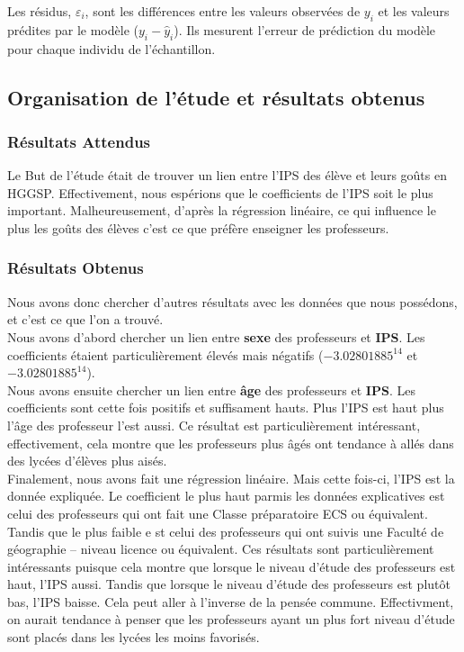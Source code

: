 \documentclass[a4paper, 11pt]{article}
\begin{document}
Les résidus, \(\varepsilon_i\), sont les différences entre les valeurs observées de \(y_i\) et les valeurs prédites par le modèle (\(y_i - \hat{y}_i\)). Ils mesurent l'erreur de prédiction du modèle pour chaque individu de l'échantillon.

\subsection{Organisation de l'étude et résultats obtenus}
\subsubsection{Résultats Attendus}

Le But de l'étude était de trouver un lien entre l'IPS des élève et leurs goûts en HGGSP. Effectivement, nous espérions que le coefficients de l'IPS soit le plus important. Malheureusement, d'après la régression linéaire, ce qui influence le plus les goûts des élèves c'est ce que préfère enseigner les professeurs.

\subsubsection{Résultats Obtenus}

Nous avons donc chercher d'autres résultats avec les données que nous possédons, et c'est ce que l'on a trouvé.\\
Nous avons d'abord chercher un lien entre \textbf{sexe} des professeurs et \textbf{IPS}. Les coefficients étaient particulièrement élevés mais négatifs ($-3.02801885^{14}$ et $-3.02801885^{14}$).\\
Nous avons ensuite chercher un lien entre \textbf{âge} des professeurs et \textbf{IPS}. Les coefficients sont cette fois positifs et suffisament hauts. Plus l'IPS est haut plus l'âge des professeur l'est aussi. Ce résultat est particulièrement intéressant, effectivement, cela montre que les professeurs plus âgés ont tendance à allés dans des lycées d'élèves plus aisés.\\
Finalement, nous avons fait une régression linéaire. Mais cette fois-ci, l'IPS est la donnée expliquée. Le coefficient le plus haut parmis les données explicatives est celui des professeurs qui ont fait une Classe préparatoire ECS ou équivalent. Tandis que le plus faible e st celui des professeurs qui ont suivis une Faculté de géographie – niveau licence ou équivalent. Ces résultats sont particulièrement intéressants puisque cela montre que lorsque le niveau d'étude des professeurs est haut, l'IPS aussi. Tandis que lorsque le niveau d'étude des professeurs est plutôt bas, l'IPS baisse. Cela peut aller à l'inverse de la pensée commune. Effectivment, on aurait tendance à penser que les professeurs ayant un plus fort niveau d'étude sont placés dans les lycées les moins favorisés.
\end{document}
